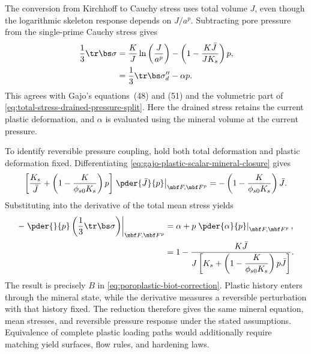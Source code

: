 The conversion from Kirchhoff to Cauchy stress uses total volume \(J\),
even though the logarithmic skeleton response depends on \(J/a^p\).
Subtracting pore pressure from the single-prime Cauchy stress gives
\begin{align*}
 \frac13\tr\bs\sigma
 &=\frac{K}{J}\ln\left(\frac{J}{a^p}\right)
 -\left(1-\frac{K\bar J}{JK_s}\right)p,
\\
 &=\frac13\tr\bs\sigma^{\prime\prime}_d-\alpha p.
\end{align*}
This agrees with Gajo's equations~(48) and (51) and the volumetric part of
\eqref{eq:total-stress-drained-pressure-split}.  Here the drained stress
retains the current plastic deformation, and \(\alpha\) is evaluated using
the mineral volume at the current pressure.

To identify reversible pressure coupling, hold both total deformation and
plastic deformation fixed.  Differentiating
\eqref{eq:gajo-plastic-scalar-mineral-closure} gives
\begin{equation*}
 \left[\frac{K_s}{\bar J}
 +\left(1-\frac{K}{\phi_{s0}K_s}\right)p\right]
 \left.\pder{\bar J}{p}\right|_{\mbf F,\mbf F^p}
 =-\left(1-\frac{K}{\phi_{s0}K_s}\right)\bar J.
\end{equation*}
Substituting into the derivative of the total mean stress yields
\begin{align*}
 -\left.\pder{}{p}\left(\frac13\tr\bs\sigma\right)\right|_{\mbf F,\mbf F^p}
 &=\alpha+p\left.\pder{\alpha}{p}\right|_{\mbf F,\mbf F^p},
\\
 &=1-\frac{K\bar J}
 {J\left[K_s+\left(1-\dfrac{K}{\phi_{s0}K_s}\right)p\bar J\right]}.
\end{align*}
The result is precisely \(B\) in \eqref{eq:poroplastic-biot-correction}.
Plastic history enters through the mineral state, while the derivative
measures a reversible perturbation with that history fixed.  The reduction therefore gives the same mineral equation, mean stresses,
and reversible pressure response under the stated assumptions.  Equivalence
of complete plastic loading paths would additionally require matching
yield surfaces, flow rules, and hardening laws.
